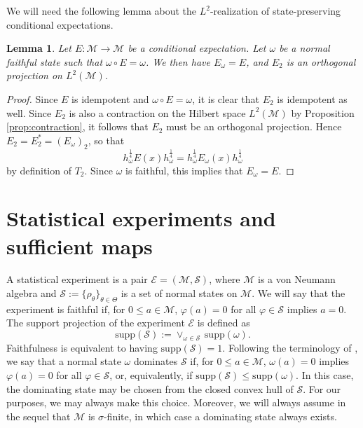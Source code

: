\documentclass[12pt]{article}
\def\Me{\mathcal M}
\def\Ee{\mathcal E}
\def\Se{\mathcal S}
\def\supp{\mathrm{supp}}
\newtheorem{lemma}{Lemma}
\theoremstyle{definition}
\theoremstyle{remark}
\begin{document}
%
%
%



We will need the following lemma about the $L^2$-realization of state-preserving conditional expectations.

\begin{lemma}\label{lemma:idempotent} Let $E:\Me\to \Me$ be a conditional expectation.
Let $\omega$ be a normal faithful state such that $\omega\circ E=\omega$. 
We then have $E_\omega=E$, and $E_2$ is an
 orthogonal projection on $L^2(\Me)$. 

\end{lemma}

\begin{proof} Since $E$ is idempotent and $\omega\circ E=\omega$, it is clear that $E_2$ is
idempotent as well. Since $E_2$ is also a contraction on the Hilbert space $L^2(\Me)$ by Proposition
\ref{prop:contraction}, it follows that $E_2$ must be an orthogonal projection. Hence
$E_2=E_2^*=(E_\omega)_2$, so that 
\[
h_{\omega}^{\frac14}E(x)h_\omega^{\frac14}=h_{\omega}^{\frac14}E_\omega(x)h_\omega^{\frac14}
\]
by definition of $T_2$. 
Since $\omega$ is faithful, this implies that $E_\omega=E$.

\end{proof}


\section{Statistical experiments and sufficient maps}

A statistical experiment is a pair $\Ee=(\Me,\Se)$, where  $\Me$ is a von Neumann algebra and   $\Se:=\{\rho_\theta\}_{\theta\in
\Theta}$ is a set of normal states on  $\Me$. 
We will say that the experiment is faithful if, for $0\le a \in \Me$, $\varphi(a)=0$ for all $\varphi\in \Se$ implies $a=0$.
The support projection of the experiment $\Ee$ is defined as
\[
\supp(\Se) := \vee_{\omega\in\Se}\,\supp(\omega).
\] 
Faithfulness is equivalent to having $\supp(\Se)=1$. Following the terminology of
\cite{jencova2006sufficiencyfirst}, we say that a normal state $\omega$ dominates $\Se$ if, for $0\le a\in \Me$, $\omega(a)=0$ implies $\varphi(a)=0$ for all $\varphi\in \Se$, or, equivalently, if $\supp(\Se)\le \supp(\omega)$.
In this case, the dominating state may be chosen from the closed convex hull of $\Se$.
For our purposes, we may always make this choice. Moreover,
we will always assume in
the sequel that $\Me$ is $\sigma$-finite, in which case a dominating state always exists. 
\end{document}
